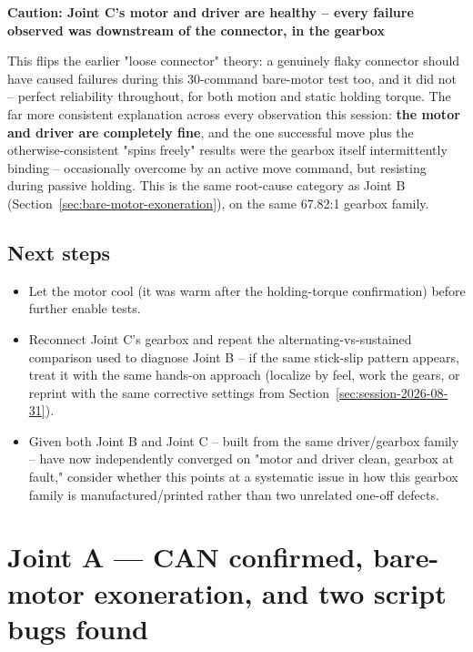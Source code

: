 \documentclass[11pt,letterpaper]{article}
\newenvironment{caution}[1]{%
    \par\addvspace{8pt}%
    \noindent{\color{cautionred}\rule{\linewidth}{0.8pt}}\par\vspace{2pt}
    \noindent\textbf{\color{cautionred}Caution: #1}\par\vspace{2pt}
}{%
    \par\vspace{2pt}\noindent{\color{cautionred}\rule{\linewidth}{0.4pt}}%
    \par\addvspace{8pt}%
}
\begin{document}
\begin{caution}{Joint C's motor and driver are healthy -- every failure observed was downstream of the connector, in the gearbox}
This flips the earlier "loose connector" theory: a genuinely flaky connector should have caused failures during this 30-command bare-motor test too, and it did not -- perfect reliability throughout, for both motion and static holding torque. The far more consistent explanation across every observation this session: \textbf{the motor and driver are completely fine}, and the one successful move plus the otherwise-consistent "spins freely" results were the gearbox itself intermittently binding -- occasionally overcome by an active move command, but resisting during passive holding. This is the same root-cause category as Joint B (Section~\ref{sec:bare-motor-exoneration}), on the same 67.82:1 gearbox family.
\end{caution}

\subsection{Next steps}
\begin{itemize}
    \item Let the motor cool (it was warm after the holding-torque confirmation) before further enable tests.
    \item Reconnect Joint C's gearbox and repeat the alternating-vs-sustained comparison used to diagnose Joint B -- if the same stick-slip pattern appears, treat it with the same hands-on approach (localize by feel, work the gears, or reprint with the same corrective settings from Section~\ref{sec:session-2026-08-31}).
    \item Given both Joint B and Joint C -- built from the same driver/gearbox family -- have now independently converged on "motor and driver clean, gearbox at fault," consider whether this points at a systematic issue in how this gearbox family is manufactured/printed rather than two unrelated one-off defects.
\end{itemize}

\section{Joint A --- CAN confirmed, bare-motor exoneration, and two script bugs found}
\label{sec:session-joint-a}
\end{document}

